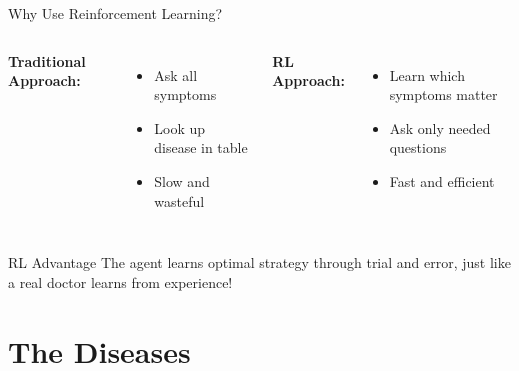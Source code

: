 \documentclass[aspectratio=169]{beamer}
\begin{document}
\begin{frame}{Why Use Reinforcement Learning?}
    \begin{columns}
        \textbf{Traditional Approach:}
        \begin{itemize}
            \item Ask all symptoms
            \item Look up disease in table
            \item Slow and wasteful
        \end{itemize}
        
        \textbf{RL Approach:}
        \begin{itemize}
            \item Learn which symptoms matter
            \item Ask only needed questions
            \item Fast and efficient
        \end{itemize}
    \end{columns}
    
    \vspace{0.5cm}
    
    \begin{block}{RL Advantage}
        The agent learns optimal strategy through trial and error, just like a real doctor learns from experience!
    \end{block}
\end{frame}

\section{The Diseases}
\end{document}
